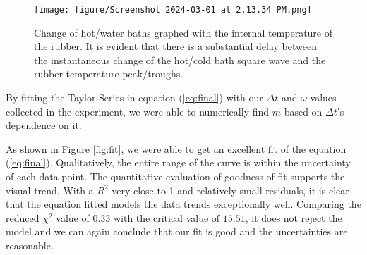 \documentclass[12pt]{article}
\begin{document}
\begin{figure}[h!]
    \centering
    \texttt{[image: figure/Screenshot 2024-03-01 at 2.13.34 PM.png]}
    \caption{Change of hot/water baths graphed with the internal temperature of the rubber. It is evident that there is a substantial delay between the instantaneous change of the hot/cold bath square wave and the rubber temperature peak/troughs.}
    \label{fig:1}
\end{figure}

By fitting the Taylor Series in equation (\ref{eq:final}) with our $\Delta t$ and $\omega$ values collected in the experiment, we were able to numerically find $m$ based on $\Delta t$'s dependence on it.

As shown in Figure \ref{fig:fit}, we were able to get an excellent fit of the equation (\ref{eq:final}). Qualitatively, the entire range of the curve is within the uncertainty of each data point. The quantitative evaluation of goodness of fit supports the visual trend. With a $R^2$ very close to 1 and relatively small residuals, it is clear that the equation fitted models the data trends exceptionally well. Comparing the reduced $\chi^2$ value of $0.33$ with the critical value of $15.51$, it does not reject the model and we can again conclude that our fit is good and the uncertainties are reasonable.
\end{document}
